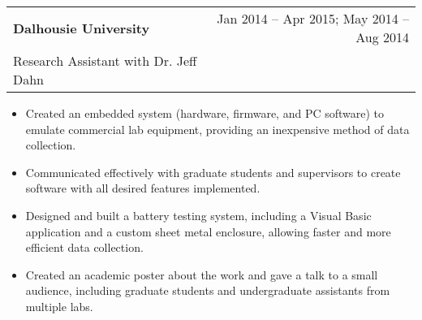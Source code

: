 \documentclass{article}
\begin{document}
\begin{center}
\begin{tabularx}{\textwidth}{Xr}
	\textbf{Dalhousie University}	& 
	Jan 2014 -- Apr 2015; May 2014 -- Aug 2014 \\
	Research Assistant with Dr. Jeff Dahn
\end{tabularx}
\end{center}
\begin{itemize}
	\item Created an embedded system (hardware, firmware, and PC software) to emulate commercial lab equipment, providing an inexpensive method of data collection.
	\item Communicated effectively with graduate students and supervisors to create software with all desired features implemented.
	\item Designed and built a battery testing system, including a Visual Basic application and a custom sheet metal enclosure, allowing faster and more efficient data collection.
	\item Created an academic poster about the work and gave a talk to a small audience, including graduate students and undergraduate assistants from multiple labs.
\end{itemize}
\end{document}
